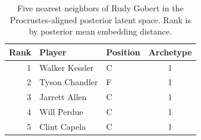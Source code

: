 \begin{table}[htbp]
  \centering\small
  \begin{tabular}{rllc}
    \toprule
    Rank & Player & Position & Archetype \\
    \midrule
    1 & Walker Kessler & C & 1 \\
    2 & Tyson Chandler & F & 1 \\
    3 & Jarrett Allen & C & 1 \\
    4 & Will Perdue & C & 1 \\
    5 & Clint Capela & C & 1 \\
    \bottomrule
  \end{tabular}
  \caption{Five nearest neighbors of Rudy Gobert in the Procrustes-aligned posterior latent space. Rank is by posterior mean embedding distance.}
  \label{tab:Rudy_Gobert_neighbors}
\end{table}


